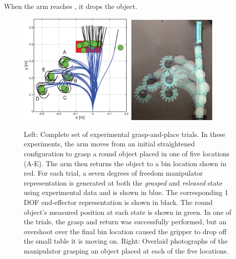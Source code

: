 When the arm reaches , it drops the object.

\begin{figure}[htbp]
\begin{centering}
  \includegraphics[width=0.5\textwidth]{Figures/experimental_results/allTestsOverlaid.eps}
\includegraphics[width=0.385\textwidth]{figures/experimental_results/five_grasps.jpg}
\caption[Left: All 25 experimental grasping trials.]{Left: Complete set of experimental grasp-and-place trials. In these experiments, the arm moves from an initial straightened configuration to grasp a round object placed in one of five locations (A-E). The arm then returns the object to a bin location shown in red. For each trial, a seven degrees of freedom manipulator representation is generated at both the \emph{grasped} and \emph{released} state using experimental data and is shown in blue. The corresponding 1 DOF end-effector representation is shown in black. The round object's measured position at each state is shown in green. In one of the trials, the grasp and return was successfully performed, but an overshoot over the final bin location caused the gripper to drop off the small table it is moving on. Right: Overlaid photographs of the manipulator grasping an object placed at each of the five locations. }\label{fig:allTestsOverlaid}

\end{centering}
\end{figure}
